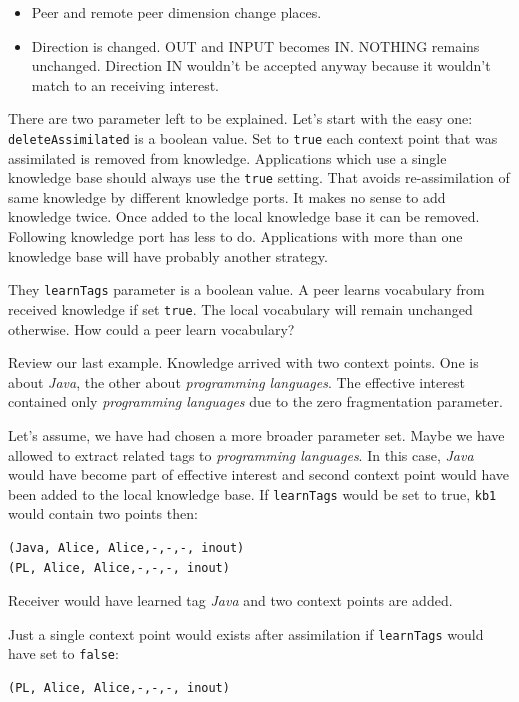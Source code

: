 \begin{itemize}
\item Peer and remote peer dimension change places.
\item Direction is changed. OUT and INPUT becomes IN. NOTHING remains unchanged. Direction IN wouldn't be accepted anyway because it wouldn't match to an receiving interest.
\end{itemize}

There are two parameter left to be explained. Let's start with the easy one: 
{\tt deleteAssimilated} is a boolean value. Set to {\tt true} each context point that was assimilated is removed from knowledge. Applications which use a single knowledge base should always use the {\tt true} setting. That avoids re-assimilation of same knowledge by different knowledge ports. It makes no sense to add knowledge twice. Once added to the local knowledge base it can be removed. Following knowledge port has less to do. Applications with more than one knowledge base will have probably another strategy.

They {\tt learnTags} parameter is a boolean value. A peer learns vocabulary from received knowledge if set {\tt true}. The local vocabulary will remain unchanged otherwise. How could a peer learn vocabulary?

Review our last example. Knowledge arrived with two context points. One is about {\it Java}, the other about {\it programming languages}. The effective interest contained only {\it programming languages} due to the zero fragmentation parameter. 

Let's assume, we have had chosen a more broader parameter set. Maybe we have allowed to extract related tags to {\it programming languages}. In this case, {\it Java} would have become part of effective interest and second context point would have been added to the local knowledge base. If {\tt learnTags} would be set to true, {\tt kb1} would contain two points then:

\begin{verbatim}
(Java, Alice, Alice,-,-,-, inout)
(PL, Alice, Alice,-,-,-, inout)
\end{verbatim}

Receiver would have learned tag {\it Java} and two context points are added.

Just a single context point would exists after assimilation if {\tt learnTags} would have set to {\tt false}: 

\begin{verbatim}
(PL, Alice, Alice,-,-,-, inout)
\end{verbatim}

